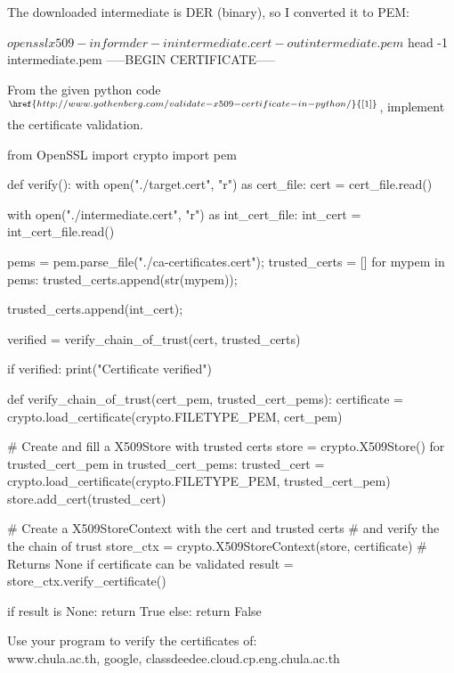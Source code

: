 \documentclass[a4paper, 10pt]{article}
\begin{document}
\begin{solution}
	\noindent The downloaded intermediate is DER (binary), so I converted it to PEM:

	\myspace

\begin{codingbox*}[numbers=none, xleftmargin=0pt, belowskip=6pt, basicstyle=\ttfamily\footnotesize\color{editortext}]
$ openssl x509 -inform der -in intermediate.cert -out intermediate.pem
$ head -1 intermediate.pem
-----BEGIN CERTIFICATE-----
\end{codingbox*}
\end{solution}

\begin{problem}
	From the given python code\( ^{\href{http://www.yothenberg.com/validate-x509-certificate-in-python/}{[1]}} \),
	implement the certificate validation.
	\begin{codingbox*}
from OpenSSL import crypto
import pem

def verify():
	with open("./target.cert", "r") as cert_file:
		cert = cert_file.read()

	with open("./intermediate.cert", "r") as int_cert_file:
		int_cert = int_cert_file.read()

	pems = pem.parse_file("./ca-certificates.cert");
	trusted_certs = []
	for mypem in pems:
		trusted_certs.append(str(mypem));

	trusted_certs.append(int_cert);
	
	verified = verify_chain_of_trust(cert, trusted_certs)

	if verified:
		print("Certificate verified")


def verify_chain_of_trust(cert_pem, trusted_cert_pems):
	certificate = crypto.load_certificate(crypto.FILETYPE_PEM, cert_pem)
	
	# Create and fill a X509Store with trusted certs
	store = crypto.X509Store()
	for trusted_cert_pem in trusted_cert_pems:
		trusted_cert = crypto.load_certificate(crypto.FILETYPE_PEM, trusted_cert_pem)
		store.add_cert(trusted_cert)

	# Create a X509StoreContext with the cert and trusted certs
	# and verify the the chain of trust
	store_ctx = crypto.X509StoreContext(store, certificate)
	# Returns None if certificate can be validated
	result = store_ctx.verify_certificate()

	if result is None:
		return True
	else:
		return False
\end{codingbox*}
	\noindent Use your program to verify the certificates of: \\
	www.chula.ac.th, google, classdeedee.cloud.cp.eng.chula.ac.th
\end{problem}
\end{document}
